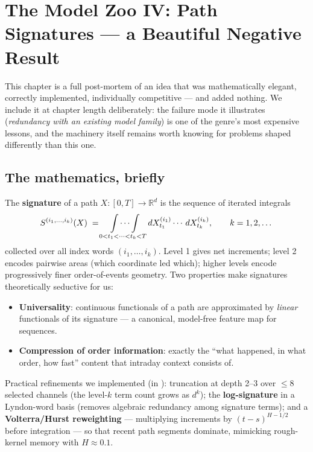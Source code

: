 \chapter[Path Signatures]{The Model Zoo IV: Path Signatures --- a Beautiful Negative Result}
\label{ch:signatures}

This chapter is a full post-mortem of an idea that was mathematically
elegant, correctly implemented, individually competitive --- and added
nothing. We include it at chapter length deliberately: the failure mode it
illustrates (\emph{redundancy with an existing model family}) is one of the
genre's most expensive lessons, and the machinery itself remains worth
knowing for problems shaped differently than this one.

\section{The mathematics, briefly}

The \textbf{signature} of a path $X: [0, T] \to \mathbb R^d$ is the
sequence of iterated integrals
\[
S^{(i_1, \dots, i_k)}(X) \;=\;
\idotsint\limits_{0 < t_1 < \cdots < t_k < T}
dX^{(i_1)}_{t_1} \cdots\, dX^{(i_k)}_{t_k},
\qquad k = 1, 2, \dots
\]
collected over all index words $(i_1,\dots,i_k)$. Level 1 gives net
increments; level 2 encodes pairwise areas (which coordinate led which);
higher levels encode progressively finer order-of-events geometry. Two
properties make signatures theoretically seductive for us:

\begin{itemize}
\item \textbf{Universality}: continuous functionals of a path are
  approximated by \emph{linear} functionals of its signature --- a
  canonical, model-free feature map for sequences.
\item \textbf{Compression of order information}: exactly the ``what
  happened, in what order, how fast'' content that intraday context
  consists of.
\end{itemize}

Practical refinements we implemented (in ): truncation at depth 2--3 over $\le 8$ selected channels
(the level-$k$ term count grows as $d^k$); the \textbf{log-signature} in a
Lyndon-word basis (removes algebraic redundancy among signature terms);
and a \textbf{Volterra/Hurst reweighting} --- multiplying increments by
$(t - s)^{H - 1/2}$ before integration --- so that recent path segments
dominate, mimicking rough-kernel memory with $H \approx 0.1$.

